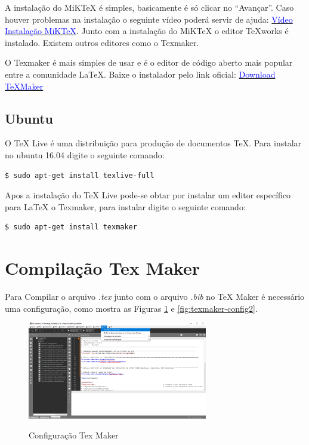 A instalação do MiKTeX é simples, basicamente é só clicar no “Avançar”. Caso houver problemas na instalação o seguinte vídeo poderá servir de ajuda: \href{https://www.youtube.com/watch?v=4udFXbqtayE&list=LLQVoeslEpxQJ0UavpXUEkq}{\textcolor{blue}{Vídeo Instalação MiKTeX}}. Junto com a instalação do MiKTeX o editor TeXworks é instalado. Existem outros editores como o Texmaker. 

O Texmaker é mais simples de usar e é o editor de código aberto mais popular entre a comunidade LaTeX. Baixe o instalador pelo link oficial: \href{http://www.xm1math.net/texmaker/download.html}{\textcolor{blue}{Download TeXMaker}}

\subsection{Ubuntu}

O TeX Live é uma distribuição para produção de documentos \TeX \xspace. Para instalar no ubuntu 16.04 digite o seguinte comando: 
\begin{lstlisting}[language=bash]
    $ sudo apt-get install texlive-full
\end{lstlisting}

Apos a instalação do TeX Live pode-se obtar por instalar um editor específico para LaTeX o Texmaker, para instalar digite o seguinte comando: 

\begin{lstlisting}[language=bash]
    $ sudo apt-get install texmaker
\end{lstlisting}

\section{Compilação Tex Maker}

Para Compilar o arquivo \emph{.tex} junto com o arquivo \emph{.bib} no TeX Maker é necessário uma configuração, como mostra as Figuras \ref{fig:texmaker-config1} e \ref{fig:texmaker-config2}.

\begin{figure}[H]
    \centering
    \caption{Configuração Tex Maker}
    \includegraphics[width=0.70\textwidth]{./dados/figuras/compiler1}
    \label{fig:texmaker-config1}
\end{figure}

